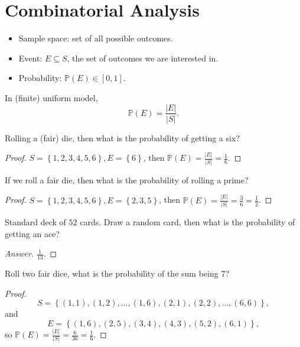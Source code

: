 \chapter{Combinatorial Analysis}
\begin{definition}
\hfill 
\begin{itemize}
    \item Sample space: set of all possible outcomes. 
    \item Event: \(E \subseteq S\), the set of outcomes we are interested in. 
    \item Probability: \(\mathbb{P} (E) \in [0, 1]\).  
\end{itemize}
\end{definition}

\begin{remark}
    In (finite) uniform model, 
    \[
        \mathbb{P} (E) = \frac{\vert E \vert }{\vert S \vert }.
    \]
\end{remark}

\begin{eg}
    Rolling a (fair) die, then what is the probability of getting a six?
\end{eg}

\begin{proof}
    \(S = \left\{ 1, 2, 3, 4, 5, 6 \right\}, E = \left\{ 6 \right\}  \), then \(\mathbb{P} (E) = \frac{\vert E \vert }{\vert S \vert } = \frac{1}{6}\).  
\end{proof}

\begin{eg}
    If we roll a fair die, then what is the probability of rolling a prime?
\end{eg}
\begin{proof}
    \(S = \left\{ 1, 2, 3, 4, 5, 6 \right\}, E = \left\{ 2, 3, 5 \right\}  \), then \(\mathbb{P} (E) = \frac{\vert E \vert }{\vert S \vert } = \frac{3}{6} = \frac{1}{2}\).  
\end{proof}

\begin{eg}
    Standard deck of \(52\) cards. Draw a random card, then what is the probability of getting an ace? 
\end{eg}
\begin{proof}[Answer]
    \(\frac{1}{13}\). 
\end{proof}

\begin{eg}
    Roll two fair dice, what is the probability of the sum being \(7\)? 
\end{eg}
\begin{proof}
    \[
        S = \left\{ (1, 1), (1, 2), \dots , (1, 6), (2, 1), (2, 2), \dots , (6, 6) \right\}, 
    \]
    and 
    \[
        E = \left\{ (1, 6), (2, 5), (3, 4), (4, 3), (5, 2), (6, 1) \right\}, 
    \]
    so \(\mathbb{P} (E)  = \frac{\vert E \vert }{\vert S \vert } = \frac{6}{36} = \frac{1}{6}\). 
\end{proof}

